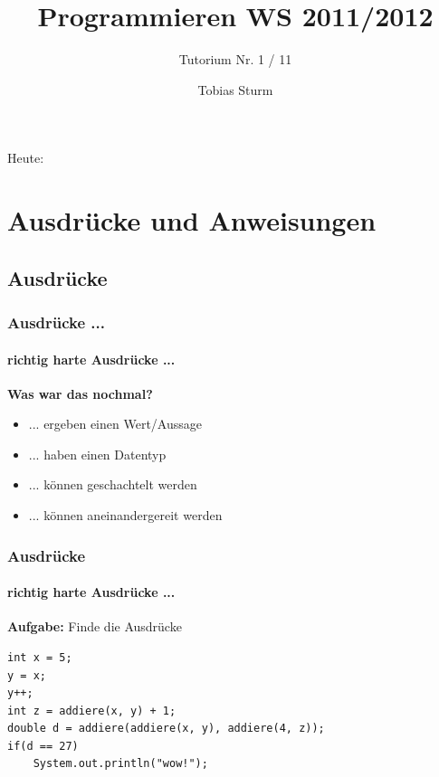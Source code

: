 \documentclass[18pt]{beamer}
\title[Proggen WS11/12]{Programmieren WS 2011/2012}
\subtitle{Tutorium Nr. 1 / 11}
\author{Tobias Sturm} %
\institute{Zertifizierbare Vertrauenswürdige Informatiksysteme}
\date[23.1.12] %
\begin{document}


\begin{frame}
	\titlepage
\end{frame}


\begin{frame}{Heute:}
	\tableofcontents
\end{frame}


\section{Ausdrücke und Anweisungen}
\subsection{Ausdrücke}
\begin{frame}
	\frametitle{Ausdrücke ...}
	\framesubtitle{richtig harte Ausdrücke ...}
	
	\textbf{Was war das nochmal?} \pause
	
		\begin{itemize}
			\item ... ergeben einen Wert/Aussage
			\item ... haben einen Datentyp
			\item ... können geschachtelt werden
			\item ... können aneinandergereit werden
		\end{itemize}
\end{frame}


\begin{frame}[containsverbatim]
	\frametitle{Ausdrücke}
	\framesubtitle{richtig harte Ausdrücke ...}
	
		\textbf{Aufgabe:} Finde die Ausdrücke	
		\begin{lstlisting}
int x = 5;
y = x;
y++;
int z = addiere(x, y) + 1;
double d = addiere(addiere(x, y), addiere(4, z));
if(d == 27)
	System.out.println("wow!");
		\end{lstlisting}

\end{frame}
\end{document}
